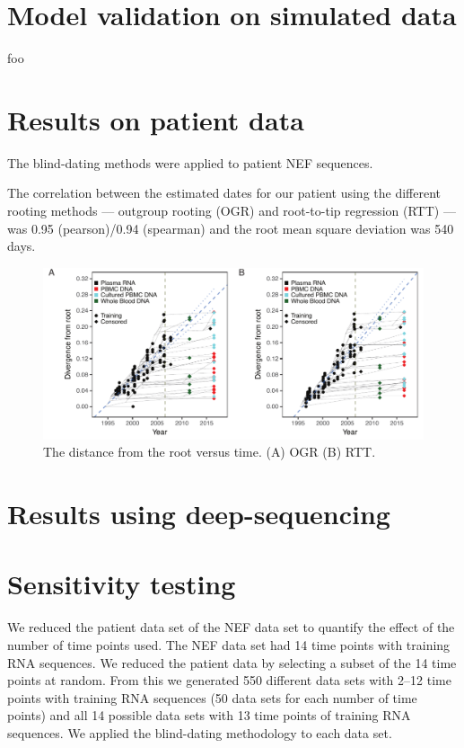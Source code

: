 \documentclass[9pt,twocolumn,twoside,lineno]{pnas-new}
\begin{document}
\section*{Model validation on simulated data}
foo

\section*{Results on patient data}
The blind-dating methods were applied to patient NEF sequences.

The correlation between the estimated dates for our patient using the different rooting methods --- outgroup rooting (OGR) and root-to-tip regression (RTT) --- was 0.95 (pearson)/0.94 (spearman) and the root mean square deviation was 540 days.

\begin{figure}
\includegraphics{nefdistvtime}
\caption{The distance from the root versus time.
(A) OGR (B) RTT.}
\label{fig:nefdistvtime}
\end{figure}

\section*{Results using deep-sequencing}

\section*{Sensitivity testing}
We reduced the patient data set of the NEF data set to quantify the effect of the number of time points used.
The NEF data set had 14 time points with training RNA sequences.
We reduced the patient data by selecting a subset of the 14 time points at random.
From this we generated 550 different data sets with 2--12 time points with training RNA sequences (50 data sets for each number of time points) and all 14 possible data sets with 13 time points of training RNA sequences.
We applied the blind-dating methodology to each data set.
\end{document}
